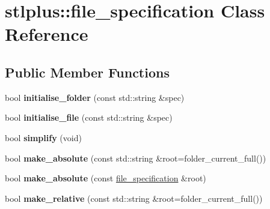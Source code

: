 \hypertarget{classstlplus_1_1file__specification}{}\section{stlplus\+:\+:file\+\_\+specification Class Reference}
\label{classstlplus_1_1file__specification}
\subsection*{Public Member Functions}
\begin{DoxyCompactItemize}
\item 
bool {\bfseries initialise\+\_\+folder} (const std\+::string \&spec)\hypertarget{classstlplus_1_1file__specification_aa68aa0e8ce18e4852a1ee397b91a84f3}{}\label{classstlplus_1_1file__specification_aa68aa0e8ce18e4852a1ee397b91a84f3}

\item 
bool {\bfseries initialise\+\_\+file} (const std\+::string \&spec)\hypertarget{classstlplus_1_1file__specification_a5ee34ed5f9cabf9ed5cc0f8df58c65d4}{}\label{classstlplus_1_1file__specification_a5ee34ed5f9cabf9ed5cc0f8df58c65d4}

\item 
bool {\bfseries simplify} (void)\hypertarget{classstlplus_1_1file__specification_a1ca07e249fe3c78ec365d92806802706}{}\label{classstlplus_1_1file__specification_a1ca07e249fe3c78ec365d92806802706}

\item 
bool {\bfseries make\+\_\+absolute} (const std\+::string \&root=folder\+\_\+current\+\_\+full())\hypertarget{classstlplus_1_1file__specification_a3e122446c40d527ce76fdf984118ed48}{}\label{classstlplus_1_1file__specification_a3e122446c40d527ce76fdf984118ed48}

\item 
bool {\bfseries make\+\_\+absolute} (const \hyperlink{classstlplus_1_1file__specification}{file\+\_\+specification} \&root)\hypertarget{classstlplus_1_1file__specification_a9f6ad4e33b40825f7c87a8a6bd562c15}{}\label{classstlplus_1_1file__specification_a9f6ad4e33b40825f7c87a8a6bd562c15}

\item 
bool {\bfseries make\+\_\+relative} (const std\+::string \&root=folder\+\_\+current\+\_\+full())\hypertarget{classstlplus_1_1file__specification_a2fc78f8b19bbdec804a53438abcb0660}{}\label{classstlplus_1_1file__specification_a2fc78f8b19bbdec804a53438abcb0660}


\end{DoxyCompactItemize}

